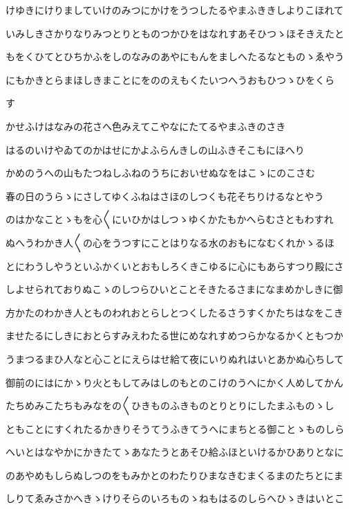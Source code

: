 \documentclass[a4paper,11pt,landscape]{ltjtarticle}
\begin{document}
\par\medskip
けゆきにけりましていけのみつにかけをうつしたるやまふききしよりこほれて
\par\medskip
いみしきさかりなりみつとりとものつかひをはなれすあそひつゝほそきえたと
\par\medskip
もをくひてとひちかふをしのなみのあやにもんをましへたるなとものゝゑやう
\par\medskip
にもかきとらまほしきまことにをののえもくたいつへうおもひつゝひをくら
\par\medskip
す
\par\medskip
かせふけはなみの花さへ色みえてこやなにたてるやまふきのさき
\par\medskip
はるのいけやゐてのかはせにかよふらんきしの山ふきそこもにほへり
\par\medskip
かめのうへの山もたつねしふねのうちにおいせぬなをはこゝにのこさむ
\par\medskip
春の日のうらゝにさしてゆくふねはさほのしつくも花そちりけるなとやう
\par\medskip
のはかなことゝもを心〱にいひかはしつゝゆくかたもかへらむさともわすれ
\par\medskip
ぬへうわかき人〱の心をうつすにことはりなる水のおもになむくれかゝるほ
\par\medskip
とにわうしやうといふかくいとおもしろくきこゆるに心にもあらすつり殿にさ
\par\medskip
しよせられておりぬこゝのしつらひいとことそきたるさまになまめかしきに御
\par\medskip
方かたのわかき人とものわれおとらしとつくしたるさうすくかたちはなをこき
\par\medskip
ませたるにしきにおとらすみえわたる世にめなれすめつらかなるかくともつか
\par\medskip
うまつるまひ人なと心ことにえらはせ給て夜にいりぬれはいとあかぬ心ちして
\par\medskip
御前のにはにかゝり火ともしてみはしのもとのこけのうへにかく人めしてかん
\par\medskip
たちめみこたちもみなをの〱ひきものふきものとりとりにしたまふものゝし
\par\medskip
ともことにすくれたるかきりそうてうふきてうへにまちとる御ことゝものしら
\par\medskip
へいとはなやかにかきたてゝあなたうとあそひ給ふほといけるかひありとなに
\par\medskip
のあやめもしらぬしつのをもみかとのわたりひまなきむまくるまのたちとにま
\par\medskip
しりてゑみさかへきゝけりそらのいろものゝねもはるのしらへひゝきはいとこ
\end{document}
